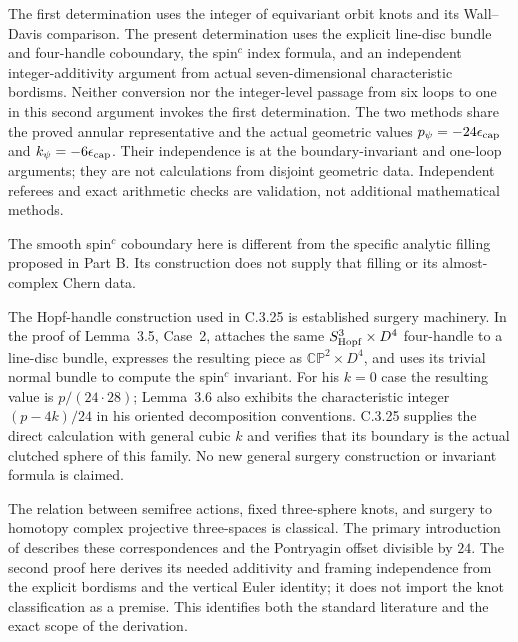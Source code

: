 \begin{remark}
The first determination uses the integer of equivariant
orbit knots and its Wall--Davis comparison. The present
determination uses the explicit line-disc bundle and
four-handle coboundary, the spin$^c$ index formula, and an
independent integer-additivity argument from actual
seven-dimensional characteristic bordisms. Neither conversion
nor the integer-level passage from six loops to one in this
second argument invokes the first determination. The two
methods share the proved annular representative and the actual
geometric values $p_\psi=-24\epsilon_{\rm cap}$ and
$k_\psi=-6\epsilon_{\rm cap}$. Their independence is at the
boundary-invariant and one-loop arguments; they are not
calculations from disjoint geometric data. Independent
referees and exact arithmetic checks are validation, not
additional mathematical methods.

The smooth spin$^c$ coboundary here is different from the
specific analytic filling proposed in Part B. Its construction
does not supply that filling or its almost-complex Chern data.
\end{remark}
\begin{remark}
The Hopf-handle construction used in C.3.25 is established
surgery machinery. In the proof of Lemma~3.5, Case~2,
\citet{Jiang2014E} attaches the same
$S^3_{\rm Hopf}\times D^4$ four-handle to a line-disc bundle,
expresses the resulting piece as $\mathbb{CP}^2\times D^4$,
and uses its trivial normal bundle to compute the spin$^c$
invariant. For his $k=0$ case the resulting value is
$p/(24\cdot28)$; Lemma~3.6 also exhibits the characteristic
integer $(p-4k)/24$ in his oriented decomposition conventions.
C.3.25 supplies the direct calculation with general cubic
$k$ and verifies that its boundary is the actual clutched
sphere of this family. No new general surgery construction
or invariant formula is claimed.

The relation between semifree actions, fixed three-sphere
knots, and surgery to homotopy complex projective three-spaces
is classical. The primary introduction of
\citet[pp.~125--126]{MontgomeryYang1968E} describes these
correspondences and the Pontryagin offset divisible by $24$.
The second proof here derives its needed additivity and
framing independence from the explicit bordisms and the
vertical Euler identity; it does not import the knot
classification as a premise. This identifies both the
standard literature and the exact scope of the derivation.
\end{remark}
